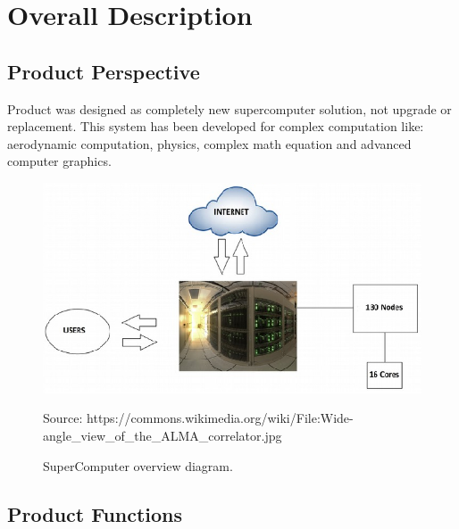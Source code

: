 \documentclass{scrreprt}
\begin{document}
\chapter{Overall Description}

\section{Product Perspective}
Product was designed as completely new supercomputer solution, not upgrade or replacement. This system has been developed for complex computation like: aerodynamic computation, physics, complex math equation and advanced computer graphics.


\begin{figure}[h!]
\centering
\includegraphics{1.png}
\caption{SuperComputer overview diagram.}
Source: https://commons.wikimedia.org/wiki/File:Wide-angle_view_of_the_ALMA_correlator.jpg
\end{figure}
\FloatBarrier



\section{Product Functions}
\end{document}
